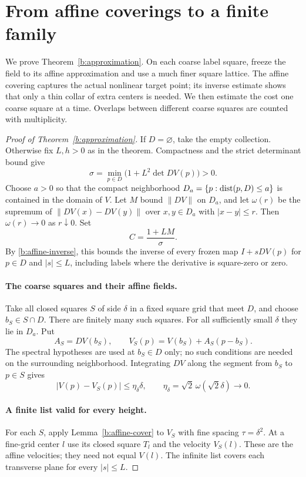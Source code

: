 \section{From affine coverings to a finite family}\label{b:finite-proof}

We prove Theorem~\ref{b:approximation}. On each coarse label square,
freeze the field to its affine approximation and use a much finer
square lattice. The affine covering captures the actual nonlinear
target point; its inverse estimate shows that only a thin collar of
extra centers is needed. We then estimate the cost one coarse square
at a time. Overlaps between different coarse squares are counted
with multiplicity.

\begin{proof}[Proof of Theorem~\ref{b:approximation}]
If $D=\varnothing$, take the empty collection. Otherwise fix $L,h>0$
as in the theorem. Compactness and the strict determinant bound give
\[
 \sigma=\min_{p\in D}\bigl(1+L^2\det DV(p)\bigr)>0.
\]
Choose $a>0$ so that the compact neighborhood
$D_a=\{p:\operatorname{dist}(p,D)\le a\}$ is contained in the domain of $V$.
Let $M$ bound $\|DV\|$ on $D_a$, and let $\omega(r)$ be the
supremum of $\|DV(x)-DV(y)\|$ over $x,y\in D_a$ with
$|x-y|\le r$. Then $\omega(r)\to0$ as $r\downarrow0$.
Set
\[
 C=\frac{1+LM}{\sigma}.
\]
By \eqref{b:affine-inverse}, this bounds the inverse of every frozen
map $I+sDV(p)$ for $p\in D$ and $|s|\le L$, including labels
where the derivative is square-zero or zero.

\paragraph{The coarse squares and their affine fields.}
Take all closed squares $S$ of side $\delta$ in a fixed square
grid that meet $D$, and choose $b_S\in S\cap D$. There are
finitely many such squares. For all sufficiently small $\delta$
they lie in $D_a$. Put
\[
 A_S=DV(b_S),\qquad V_S(p)=V(b_S)+A_S(p-b_S).
\]
The spectral hypotheses are used at $b_S\in D$ only; no such
conditions are needed on the surrounding neighborhood. Integrating
$DV$ along the segment from $b_S$ to $p\in S$ gives
\begin{equation}\label{b:finite-taylor}
 |V(p)-V_S(p)|\le\eta_\delta\delta,
 \qquad \eta_\delta=\sqrt2\,\omega(\sqrt2\delta)\longrightarrow0.
\end{equation}

\paragraph{A finite list valid for every height.}
For each $S$, apply Lemma~\ref{b:affine-cover} to $V_S$ with
fine spacing $\tau=\delta^2$. At a fine-grid center $l$ use its
closed square $T_l$ and the velocity $V_S(l)$. These are the
affine velocities; they need not equal $V(l)$. The infinite list
covers each transverse plane for every $|s|\le L$.


\end{proof}
